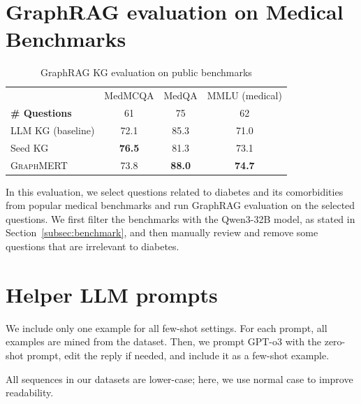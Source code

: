 \documentclass[10pt]{article}
\newcommand{\ours}{\textsc{GraphMERT}\xspace}
\begin{document}
\begin{appendices}
\clearpage 
\section{GraphRAG evaluation on Medical Benchmarks}
\label{app:public_benchmark}
\setcounter{table}{0}
\renewcommand{\thetable}{D\arabic{table}}
\setcounter{figure}{0}
\renewcommand{\thefigure}{D\arabic{figure}}


\begin{table}[ht!]
  \centering
  \caption{GraphRAG KG evaluation on public benchmarks}
  \label{tab:graphrag_public_benchmark}
  \small
  \setlength{\tabcolsep}{6pt}
  \begin{tabular}{l c c c}
    \toprule
    \rowcolor{gray!30}
      & MedMCQA & MedQA & MMLU (medical) \\
    \textbf{\# Questions} & 61 & 75 & 62 \\
    \midrule
    LLM KG (baseline) & 72.1 & 85.3 & 71.0 \\ 
    Seed KG & \textbf{76.5} & 81.3 & 73.1 \\
    \ours & 73.8 & \textbf{88.0} & \textbf{74.7} \\   
    \bottomrule
  \end{tabular}
\end{table}

In this evaluation, we select questions related to diabetes and its comorbidities from popular medical benchmarks and run GraphRAG evaluation on the selected questions. We first filter the benchmarks with the Qwen3-32B model, as stated in Section~\ref{subsec:benchmark}, and then manually review and remove some questions that are irrelevant to diabetes. 


\clearpage 
\section{Helper LLM prompts}
\label{app:graphmert_prompts}
\setcounter{table}{0}
\renewcommand{\thetable}{D\arabic{table}}
\setcounter{figure}{0}
\renewcommand{\thefigure}{D\arabic{figure}}


We include only one example for all few-shot settings.  For each prompt, all examples are mined from the dataset. Then, we prompt GPT-o3 with the zero-shot prompt, edit the reply if needed, and include it as a few-shot example.

All sequences in our datasets are lower-case; here, we use normal case to improve readability.


\end{appendices}
\end{document}
